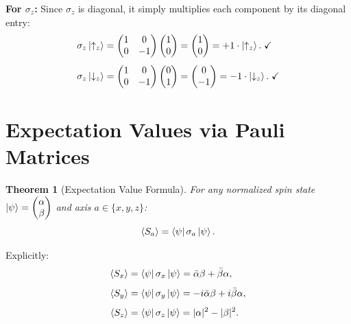 \documentclass[11pt,a4paper]{article}
\theoremstyle{definition}
\theoremstyle{plain}
\newtheorem{theorem}{Theorem}[section]
\theoremstyle{remark}
\begin{document}
\textbf{For $\sigma_z$:}
Since $\sigma_z$ is diagonal, it simply multiplies each component by its diagonal entry:
\begin{align}
    \sigma_z\ket{\uparrow_z} &= \begin{pmatrix}1&0\\0&-1\end{pmatrix}\begin{pmatrix}1\\0\end{pmatrix} = \begin{pmatrix}1\\0\end{pmatrix} = +1\cdot\ket{\uparrow_z}. \;\checkmark \\[4pt]
    \sigma_z\ket{\downarrow_z} &= \begin{pmatrix}1&0\\0&-1\end{pmatrix}\begin{pmatrix}0\\1\end{pmatrix} = \begin{pmatrix}0\\-1\end{pmatrix} = -1\cdot\ket{\downarrow_z}. \;\checkmark
\end{align}

\section{Expectation Values via Pauli Matrices}

\begin{theorem}[Expectation Value Formula]
    For any normalized spin state $\ket{\psi} = \begin{pmatrix}\alpha\\\beta\end{pmatrix}$ and axis $a \in \{x,y,z\}$:
    \[
        \langle S_a \rangle = \bra{\psi}\sigma_a\ket{\psi}.
    \]
\end{theorem}

Explicitly:
\begin{align}
    \langle S_x \rangle &= \bra{\psi}\sigma_x\ket{\psi} = \bar{\alpha}\beta + \bar{\beta}\alpha, \\[4pt]
    \langle S_y \rangle &= \bra{\psi}\sigma_y\ket{\psi} = -i\bar{\alpha}\beta + i\bar{\beta}\alpha, \\[4pt]
    \langle S_z \rangle &= \bra{\psi}\sigma_z\ket{\psi} = |\alpha|^2 - |\beta|^2.
\end{align}
\end{document}
